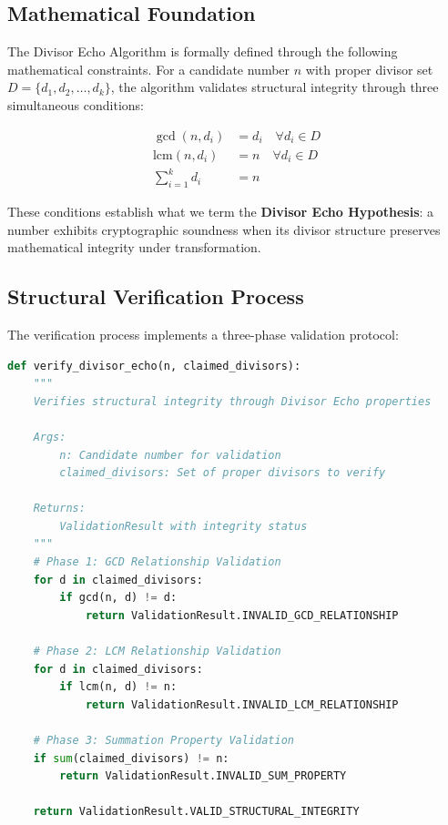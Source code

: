 \documentclass[11pt,letterpaper]{article}
\begin{document}
\subsection{Mathematical Foundation}

The Divisor Echo Algorithm is formally defined through the following mathematical constraints. For a candidate number $n$ with proper divisor set $D = \{d_1, d_2, \ldots, d_k\}$, the algorithm validates structural integrity through three simultaneous conditions:

\begin{align}
\gcd(n, d_i) &= d_i \quad \forall d_i \in D \label{eq:gcd_condition}\\
\text{lcm}(n, d_i) &= n \quad \forall d_i \in D \label{eq:lcm_condition}\\
\sum_{i=1}^{k} d_i &= n \label{eq:sum_condition}
\end{align}

These conditions establish what we term the \textbf{Divisor Echo Hypothesis}: a number exhibits cryptographic soundness when its divisor structure preserves mathematical integrity under transformation.

\subsection{Structural Verification Process}

The verification process implements a three-phase validation protocol:

\begin{lstlisting}[language=Python, caption=Divisor Echo Verification Algorithm]
def verify_divisor_echo(n, claimed_divisors):
    """
    Verifies structural integrity through Divisor Echo properties
    
    Args:
        n: Candidate number for validation
        claimed_divisors: Set of proper divisors to verify
    
    Returns:
        ValidationResult with integrity status
    """
    # Phase 1: GCD Relationship Validation
    for d in claimed_divisors:
        if gcd(n, d) != d:
            return ValidationResult.INVALID_GCD_RELATIONSHIP
    
    # Phase 2: LCM Relationship Validation  
    for d in claimed_divisors:
        if lcm(n, d) != n:
            return ValidationResult.INVALID_LCM_RELATIONSHIP
    
    # Phase 3: Summation Property Validation
    if sum(claimed_divisors) != n:
        return ValidationResult.INVALID_SUM_PROPERTY
    
    return ValidationResult.VALID_STRUCTURAL_INTEGRITY
\end{lstlisting}
\end{document}
